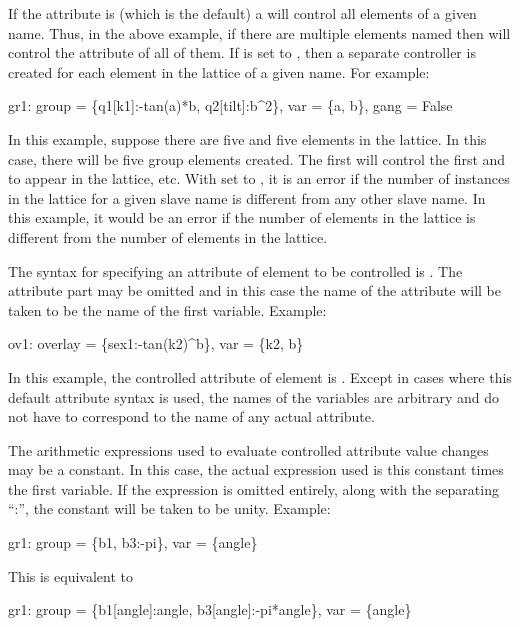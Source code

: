 If the  attribute is  (which is the default) a  will control all
elements of a given name. Thus, in the above example, if there are multiple elements named 
then  will control the  attribute of all of them.  If  is set to ,
then a separate controller is created for each element in the lattice of a given name. For example:
\begin{example}
  gr1: group = \{q1[k1]:-tan(a)*b, q2[tilt]:b^2\}, var = \{a, b\}, gang = False
\end{example}
In this example, suppose there are five  and five  elements in the lattice.  In this
case, there will be five  group elements created. The first  will control the first
 and  to appear in the lattice, etc. With  set to , it is an error
if the number of instances in the lattice for a given slave name is different from any other slave
name. In this example, it would be an error if the number of  elements in the lattice is
different from the number of  elements in the lattice.

The syntax for specifying an attribute  of element  to be controlled is
. The attribute part \vn{[attrib]} may be omitted and in this case the name of the
attribute will be taken to be the name of the first variable. Example:
\begin{example}
  ov1: overlay = \{sex1:-tan(k2)^b\}, var = \{k2, b\}
\end{example}
In this example, the controlled attribute of element  is .  Except in cases where
this default attribute syntax is used, the names of the variables are arbitrary and do not have to
correspond to the name of any actual attribute.

The arithmetic expressions used to evaluate controlled attribute value changes may be a constant. In
this case, the actual expression used is this constant times the first variable. If the expression
is omitted entirely, along with the separating ``:'', the constant will be taken to be
unity. Example:
\begin{example}
  gr1: group = \{b1, b3:-pi\}, var = \{angle\}
\end{example}
This is equivalent to
\begin{example}
  gr1: group = \{b1[angle]:angle, b3[angle]:-pi*angle\}, var = \{angle\}
\end{example}

